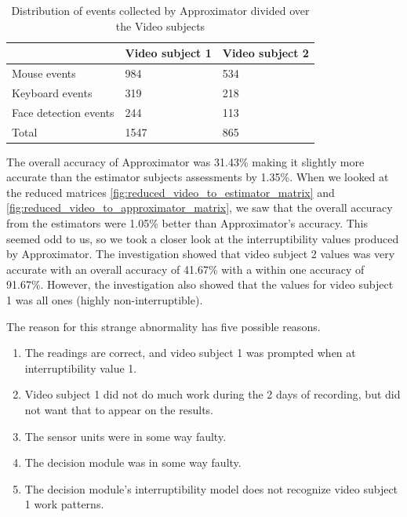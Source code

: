\documentclass{sigchi}
\begin{document}
\begin{table}[h]
  \centering
  \begin{tabular}{@{}lll@{}}
    \toprule
     & Video subject 1 & Video subject 2\\ \midrule
    Mouse events       & 984    & 534    \\
    Keyboard events       & 319    & 218    \\
    Face detection events       & 244    & 113    \\ \midrule
    Total   & 1547 & 865\\ \bottomrule
  \end{tabular}
  \caption{Distribution of events collected by Approximator divided over the Video subjects}
  \label{tab:event_distribution}
\end{table}

The overall accuracy of Approximator was 31.43\% making it slightly more accurate than the estimator subjects assessments by 1.35\%.
When we looked at the reduced matrices \autoref{fig:reduced_video_to_estimator_matrix} and \autoref{fig:reduced_video_to_approximator_matrix}, we saw that the overall accuracy from the estimators were 1.05\% better than Approximator's accuracy.
This seemed odd to us, so we took a closer look at the interruptibility values produced by Approximator.
The investigation showed that video subject 2 values was very accurate with an overall accuracy of 41.67\% with a within one accuracy of 91.67\%.
However, the investigation also showed that the values for video subject 1 was all ones (highly non-interruptible).

The reason for this strange abnormality has five possible reasons.
\begin{enumerate}
  \item The readings are correct, and video subject 1 was prompted when at interruptibility value 1.
  \item Video subject 1 did not do much work during the 2 days of recording, but did not want that to appear on the results.
  \item The sensor units were in some way faulty.
  \item The decision module was in some way faulty.
  \item The decision module's interruptibility model does not recognize video subject 1 work patterns.
\end{enumerate}
\end{document}
